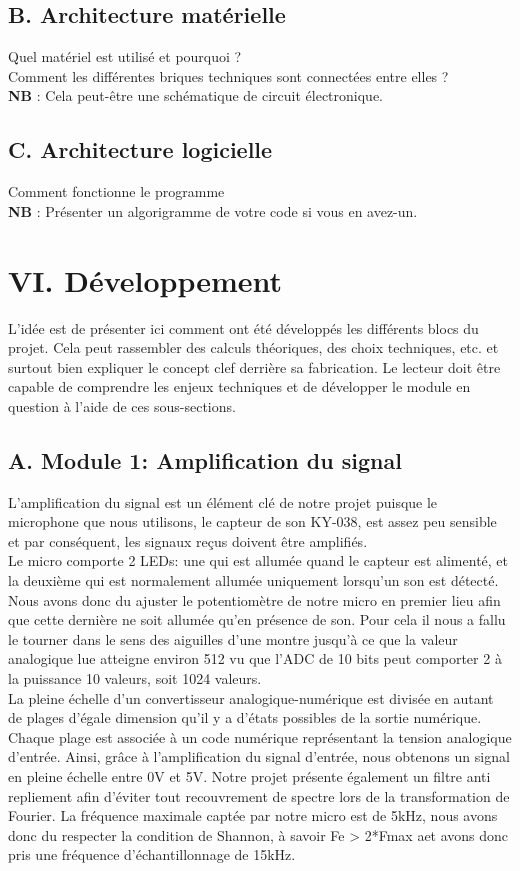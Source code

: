 \documentclass[a4paper,11pt]{book}
\begin{document}
\vspace{3mm}
\subsection*{B. Architecture matérielle}
Quel matériel est utilisé et pourquoi ?\\
\noindent Comment les différentes briques techniques sont connectées entre elles ?\\
\noindent\textbf{NB} : Cela peut-être une schématique de circuit électronique.


\subsection*{C. Architecture logicielle}
Comment fonctionne le programme\\
\noindent \textbf{NB} : Présenter un algorigramme de votre code si vous en avez-un.

\newpage
\section*{VI. Développement}
L’idée est de présenter ici comment ont été développés les différents blocs du projet. Cela peut rassembler des calculs théoriques, des choix techniques, etc. et surtout bien expliquer le concept clef derrière sa fabrication.
Le lecteur doit être capable de comprendre les enjeux techniques et de développer le module en question à l’aide de ces sous-sections.

\subsection*{A. Module 1: Amplification du signal }
L'amplification du signal est un élément clé de notre projet puisque le microphone que nous utilisons, le capteur de son KY-038, est assez peu sensible et par conséquent, les signaux reçus doivent être amplifiés.\\ 
Le micro comporte 2 LEDs: une qui est allumée quand le capteur est alimenté, et la deuxième qui est normalement allumée uniquement lorsqu'un son est détecté. 
Nous avons donc du ajuster le potentiomètre de notre micro en premier lieu afin que cette dernière ne soit allumée qu'en présence de son. Pour cela il nous a fallu le tourner dans le sens des aiguilles d'une montre jusqu'à ce que la valeur analogique lue atteigne environ 512 vu que l'ADC de 10 bits peut comporter 2 à la puissance 10 valeurs, soit 1024 valeurs. \\  
La pleine échelle d'un convertisseur analogique-numérique est divisée en autant de plages d’égale dimension qu’il y a d’états possibles de la sortie numérique. Chaque plage est associée à un code numérique représentant la tension analogique d’entrée. Ainsi, grâce à l'amplification du signal d'entrée, nous obtenons un signal en pleine échelle entre 0V et 5V. Notre projet présente également un filtre anti repliement afin d'éviter tout recouvrement de spectre lors de la transformation de Fourier. La fréquence maximale captée par notre micro est de 5kHz, nous avons donc du respecter la condition de Shannon, à savoir Fe > 2*Fmax aet avons donc pris une fréquence d'échantillonnage de 15kHz.
\end{document}

